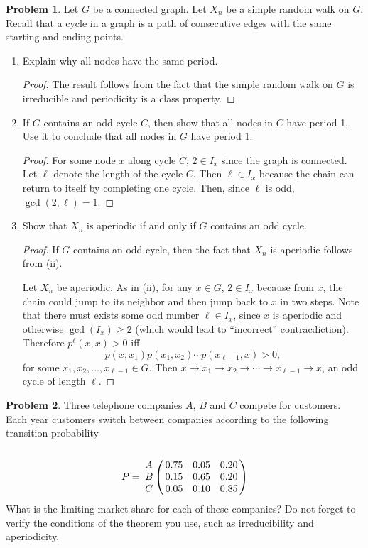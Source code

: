 \documentclass[oneside,reqno]{amsart}
\theoremstyle{definition}
\newtheorem{prob}{Problem}
\begin{document}
\begin{prob}
Let $G$ be a connected graph. Let $X_n$ be a simple random walk on $G$. Recall that a cycle in a graph is a path of consecutive edges with the same starting and ending points.
\end{prob}

\begin{enumerate}
\item
Explain why all nodes have the same period.
\begin{proof}
The result follows from the fact that the simple random walk on $G$ is irreducible and periodicity is a class property. 
\end{proof}

\item
If $G$ contains an odd cycle $C$, then show that all nodes in $C$ have period 1. Use it to conclude that all nodes in $G$ have period 1.
\begin{proof}
For some node $x$ along cycle $C$, $2 \in I_x$ since the graph is connected. Let $\ell$ denote the length of the cycle $C$. Then $\ell \in I_x$ because the chain can return to itself by completing one cycle. Then, since $\ell$ is odd, $\gcd(2, \ell) = 1$. 
\end{proof}
\item
Show that $X_n$ is aperiodic if and only if $G$ contains an odd cycle.
\begin{proof}
If $G$ contains an odd cycle, then the fact that $X_n$ is aperiodic follows from (ii).
\par
Let $X_n$ be aperiodic. As in (ii), for any $x \in G$, $2 \in I_x$ because from $x$, the chain could jump to its neighbor and then jump back to $x$ in two steps. Note that there must exists some odd number $\ell \in I_x$,  since $x$ is aperiodic and otherwise $\gcd(I_x) \geq 2$ (which would lead to ``incorrect'' contracdiction). Therefore $p^\ell(x,x) > 0$ iff 
\[
	p(x, x_1) p(x_1,x_2) \cdots p(x_{\ell-1}, x) > 0, 
\]
for some $x_1, x_2,\dotsc, x_{\ell-1} \in G$. Then $x \to x_1 \to x_2 \to \cdots \to x_{\ell - 1} \to x$, an odd cycle of length $\ell$. 
\end{proof}
\end{enumerate}


\begin{prob}
Three telephone companies $A$, $B$ and $C$ compete for customers. Each year customers switch between companies according to the following transition probability
\[
	P = \bordermatrix{~ \cr
		A & 0.75 & 0.05 & 0.20  \cr
		B & 0.15 & 0.65 & 0.20  \cr
		C & 0.05 & 0.10 & 0.85  \cr}
\]
What is the limiting market share for each of these companies? Do not forget to verify the conditions of the theorem you use, such as irreducibility and aperiodicity.
\end{prob}
\end{document}
